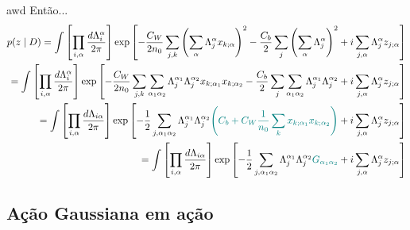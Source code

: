\documentclass{beamer}
\begin{document}
\begin{frame}{awd}
    Então...
    \tiny
    \begin{align*}
    p(z \mid D) = \int \left[ \prod_{i,\alpha} \frac{d\Lambda_{i}^{\alpha}}{2\pi} \right] 
    \exp \left[- \frac{C_W}{2n_0} \sum_{j,k} \left( \sum_\alpha \Lambda_{j}^{\alpha} x_{k;\alpha} \right)^2
    - \frac{C_b}{2} \sum_j \left( \sum_\alpha \Lambda_{j}^{\alpha} \right)^2
    + i \sum_{j,\alpha} \Lambda_{j}^{\alpha} z_{j;\alpha} \right] \\
% 
    = \int \left[ \prod_{i,\alpha} \frac{d\Lambda_{i}^{\alpha}}{2\pi} \right] 
    \exp \left[- \frac{C_W}{2n_0} \sum_{j,k} \sum_{\alpha_1\alpha_2} \Lambda_{j}^{\alpha_1}\Lambda_{j}^{\alpha_2} x_{k;\alpha_1} x_{k;\alpha_2} 
    - \frac{C_b}{2} \sum_j \sum_{\alpha_1\alpha_2} \Lambda_{j}^{\alpha_1}\Lambda_{j}^{\alpha_2}
    + i \sum_{j,\alpha} \Lambda_{j}^{\alpha} z_{j;\alpha} \right] \\
% 
    = \int \left[ \prod_{i,\alpha} \frac{d\Lambda_{i\alpha}}{2\pi} \right] 
    \exp \left[- \frac{1}{2} \sum_{j,\alpha_1\alpha_2} \Lambda_{j}^{\alpha_1}\Lambda_{j}^{\alpha_2} \textcolor{teal}{\left(C_b + C_W \frac{1}{n_0}\sum_k x_{k;\alpha_1} x_{k;\alpha_2} \right)}
    + i \sum_{j,\alpha} \Lambda_{j}^{\alpha} z_{j;\alpha} \right] \\
% 
    =  \int \left[ \prod_{i,\alpha} \frac{d\Lambda_{i\alpha}}{2\pi} \right] 
    \exp \left[- \frac{1}{2} \sum_{j,\alpha_1\alpha_2} \Lambda_{j}^{\alpha_1}\Lambda_{j}^{\alpha_2} \textcolor{teal}{G_{\alpha_1\alpha_2}}
    + i \sum_{j,\alpha} \Lambda_{j}^{\alpha} z_{j;\alpha} \right] \\
    \end{align*}
\end{frame}


\subsection{Ação Gaussiana em ação}
\begin{frame}
\tableofcontents[currentsubsection]
\end{frame}
\end{document}
